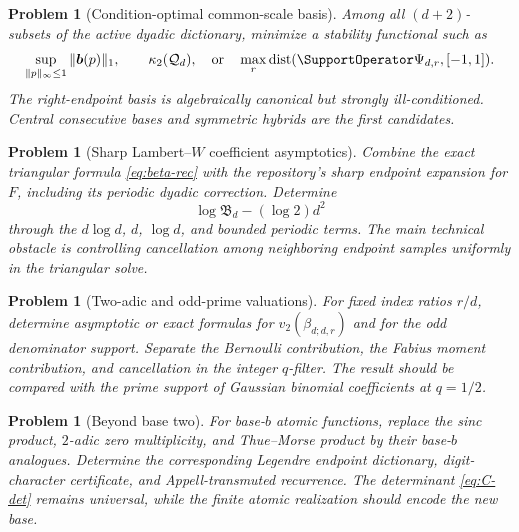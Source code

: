\documentclass[11pt,oneside]{article}
\newtheorem{problem}[theorem]{Problem}
\theoremstyle{definition}
\theoremstyle{remark}
\newcommand{\cQ}{\mathcal Q}
\begin{document}
\begin{problem}[Condition-optimal common-scale basis]
Among all $(d+2)$-subsets of the active dyadic dictionary, minimize a
stability functional such as
\begin{equation}
 \sup_{\|p\|_\infty\le1}\|\bm b(p)\|_1,
 \qquad
 \kappa_2(\cQ_d),
 \quad\text{or}\quad
 \max_r\operatorname{dist}(\SupportOperator\Psi_{d,r},[-1,1]).
 \label{eq:basis-objectives}
\end{equation}
The right-endpoint basis is algebraically canonical but strongly
ill-conditioned.  Central consecutive bases and symmetric hybrids are the
first candidates.
\end{problem}

\begin{problem}[Sharp Lambert--$W$ coefficient asymptotics]
Combine the exact triangular formula \eqref{eq:beta-rec} with the repository's
sharp endpoint expansion for $F$, including its periodic dyadic correction.
Determine
\begin{equation}
 \log\mathfrak B_d-(\log2)d^2
 \label{eq:beta-residual}
\end{equation}
through the $d\log d$, $d$, $\log d$, and bounded periodic terms.  The main
technical obstacle is controlling cancellation among neighboring endpoint
samples uniformly in the triangular solve.
\end{problem}

\begin{problem}[Two-adic and odd-prime valuations]
For fixed index ratios $r/d$, determine asymptotic or exact formulas for
$v_2(\beta_{d;d,r})$ and for the odd denominator support.  Separate the
Bernoulli contribution, the Fabius moment contribution, and cancellation in
the integer $q$-filter.  The result should be compared with the prime support
of Gaussian binomial coefficients at $q=1/2$.
\end{problem}

\begin{problem}[Beyond base two]
For base-$b$ atomic functions, replace the sinc product, $2$-adic zero
multiplicity, and Thue--Morse product by their base-$b$ analogues.  Determine
the corresponding Legendre endpoint dictionary, digit-character certificate,
and Appell-transmuted recurrence.  The determinant
\eqref{eq:C-det} remains universal, while the finite atomic realization should
encode the new base.
\end{problem}
\end{document}
